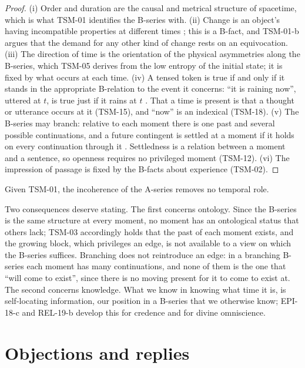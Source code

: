 \documentclass{situationist-preprint}
\begin{document}
\begin{proof}
(i) Order and duration are the causal and metrical structure of spacetime, which is what TSM-01 identifies the B-series with. (ii) Change is an object's having incompatible properties at different times \citep[§442]{Russell1903}; this is a B-fact, and TSM-01-b argues that the demand for any other kind of change rests on an equivocation. (iii) The direction of time is the orientation of the physical asymmetries along the B-series, which TSM-05 derives from the low entropy of the initial state; it is fixed by what occurs at each time. (iv) A tensed token is true if and only if it stands in the appropriate B-relation to the event it concerns: \enquote{it is raining now}, uttered at $t$, is true just if it rains at $t$ \citep{Mellor1998}. That a time is present is that a thought or utterance occurs at it (TSM-15), and \enquote{now} is an indexical (TSM-18). (v) The B-series may branch: relative to each moment there is one past and several possible continuations, and a future contingent is settled at a moment if it holds on every continuation through it \citep{Belnap2001}. Settledness is a relation between a moment and a sentence, so openness requires no privileged moment (TSM-12). (vi) The impression of passage is fixed by the B-facts about experience (TSM-02).
\end{proof}

\begin{corollary}\label{c:nocost}
Given TSM-01, the incoherence of the A-series removes no temporal role.
\end{corollary}

Two consequences deserve stating. The first concerns ontology. Since the B-series is the same structure at every moment, no moment has an ontological status that others lack; TSM-03 accordingly holds that the past of each moment exists, and the growing block, which privileges an edge, is not available to a view on which the B-series suffices. Branching does not reintroduce an edge: in a branching B-series each moment has many continuations, and none of them is the one that \enquote{will come to exist}, since there is no moving present for it to come to exist at. The second concerns knowledge. What we know in knowing what time it is, is self-locating information, our position in a B-series that we otherwise know; EPI-18-c and REL-19-b develop this for credence and for divine omniscience.

\section{Objections and replies}
\end{document}
